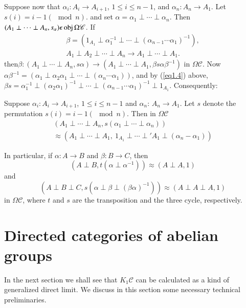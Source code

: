 Suppose now that $\alpha_i : A_i \to A_{i+1}$, $1 \leq i \leq n -1$,
and $\alpha_n : A_n \to A_1$. Let $s(i) = i-1 (\mod n)$. and set
$\alpha = \alpha_1 \perp \cdots \perp \alpha_n$. Then $(A_1 \perp
\cdots \perp A_n, s_\alpha) \epsilon \operatorname{obj} \Omega \mathscr{C}$. If  
\begin{gather*}
\beta = (1_{A_1} \perp \alpha^{-1}_1 \perp \cdots \perp 
(\alpha_{n-1}\cdots \alpha_1)^{-1}),\\
A_1 \perp A_2 \perp \cdots \perp
A_n  \to A_1 \perp \cdots \perp A_1. 
\end{gather*}
then\pageoriginale $\beta: (A_1 \perp \cdots \perp A_n, s \alpha) \to
(A_1 \perp 
\cdots \perp A_1, \beta s \alpha \beta^{-1})$ in $\Omega
\mathscr{C}$. Now $\alpha \beta^{-1} = (\alpha_1 \perp \alpha_2
\alpha_1 \perp \cdots \perp (\alpha_n \cdots \alpha_1))$, and by
(\ref{eq1.4}) 
above, $\beta s = \alpha^{-1}_1 \perp (\alpha_2 \alpha_1)^{-1} \perp
\cdots \perp (\alpha_{n-1} \cdots \alpha_1)^{-1} \perp
1_{A_1}$. Consequently: 

\setcounter{lemma}{4}
\begin{lemma}\label{chap1:lem1.5}  %
Suppose $\alpha_i: A_i \to A_{i+1}$, $1 \leq i \leq n-1$ and $\alpha_n$: $A_n
\to A_1$. Let $s$ denote the permutation $s(i) = i-1 (\mod n)$. Then
in $\Omega \mathscr{C}$ 
\begin{gather*}
(A_1 \perp \cdots \perp A_n, s(\alpha_1 \perp \cdots \perp \alpha_n))\\
\approx (A_1 \perp \cdots \perp A_1, ~ 1_{A_1} \perp \cdots \perp' A_1
\perp (\alpha_n - \alpha_1)) 
\end{gather*}

In particular, if $\alpha : A \to B$ and $\beta : B \to C$, then 
$$
(A \perp B, t(\alpha \perp \alpha^{-1})) \approx (A \perp A, 1)
$$
and
$$
(A \perp B \perp C, s(\alpha \perp \beta \perp (\beta \alpha)^{-1}))
\approx (A \perp A \perp A, 1) 
$$
in $\Omega \mathscr{C}$, where $t$ and $s$ are the transposition and
the three cycle, respectively. 
\end{lemma}


\section{Directed categories of abelian groups}\label{chap1:sec2}%

In the next section we shall see that $K_1 \mathscr{C}$ can be
calculated as a kind of generalized direct limit. We discuss in this
section some necessary technical preliminaries. 

